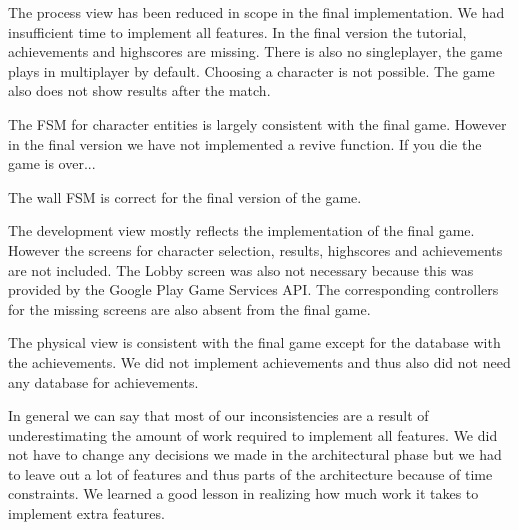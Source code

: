 
The process view has been reduced in scope in the final implementation. We had insufficient time to implement all features. In the final version the tutorial, achievements and highscores are missing. There is also no singleplayer, the game plays in multiplayer by default. Choosing a character is not possible. The game also does not show results after the match.



The FSM for character entities is largely consistent with the final game. However in the final version we have not implemented a revive function. If you die the game is over...

The wall FSM is correct for the final version of the game.


The development view mostly reflects the implementation of the final game. However the screens for character selection, results, highscores and achievements are not included. The Lobby screen was also not necessary because this was provided by the Google Play Game Services API. The corresponding controllers for the missing screens are also absent from the final game.


The physical view is consistent with the final game except for the database with the achievements. We did not implement achievements and thus also did not need any database for achievements.


In general we can say that most of our inconsistencies are a result of underestimating the amount of work required to implement all features. We did not have to change any decisions we made in the architectural phase but we had to leave out a lot of features and thus parts of the architecture because of time constraints. We learned a good lesson in realizing how much work it takes to implement extra features.